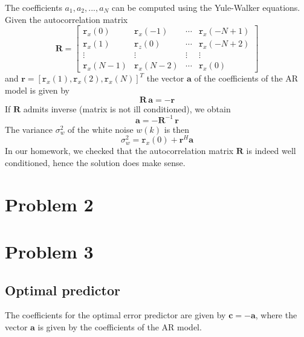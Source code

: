 \documentclass[a4paper, 12pt]{report}
\begin{document}
The coefficients $a_1, a_2, ..., a_N$ can be computed using the Yule-Walker equations. Given the autocorrelation matrix
\begin{equation}
\mathbf{R} =
\begin{bmatrix}
\mathtt{r}_x(0)		&	\mathtt{r}_x(-1) 	& \cdots &	\mathtt{r}_x(-N+1) \\
\mathtt{r}_x(1)		&	\mathtt{r}_z(0)  	& \cdots &	\mathtt{r}_x(-N+2) \\
\vdots				&	\vdots        		& \vdots &	\vdots \\
\mathtt{r}_x(N-1)	&	\mathtt{r}_x(N-2)	& \cdots &	\mathtt{r}_x(0)
\end{bmatrix}
\end{equation}
and $ \mathbf{r} = [\mathtt{r}_x(1),  \mathtt{r}_x(2),  \mathtt{r}_x(N)]^T $ the vector $\mathbf{a}$ of the coefficients of the AR model is given by
\begin{equation}\label{eq:yukewalker}
	\mathbf{R} \, \mathbf{a} = - \mathbf{r}
\end{equation}
If $\mathbf{R}$ admits inverse (matrix is not ill conditioned), we obtain
\begin{equation}
	\mathbf{a} = -\mathbf{R}^{-1} \, \mathbf{r}
\end{equation}
The variance $\sigma_w ^2$ of the white noise $w(k)$ is then
\begin{equation}
	\sigma_w ^2 = \mathtt{r}_x(0) + \mathbf{r}^H \mathbf{a}
\end{equation}
In our homework, we checked that the autocorrelation matrix $\mathbf{R}$ is indeed well conditioned, hence the solution does make sense.



\section*{Problem 2}

\section*{Problem 3}

\subsection*{Optimal predictor}
The coefficients for the optimal error predictor are given by $ \mathbf{c} = -\mathbf{a}$, where the vector $\mathbf{a}$ is given by the coefficients of the AR model.
\end{document}
